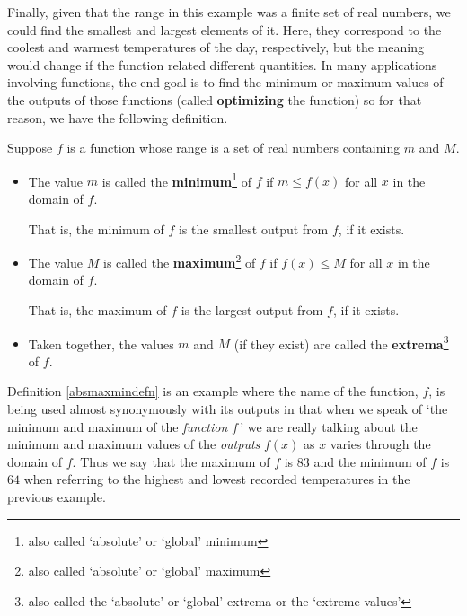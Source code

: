 \medskip

Finally, given that the range in this example was a finite set of real numbers, we could find the smallest and largest elements of it.  Here, they correspond to the coolest and warmest temperatures of the day, respectively, but the meaning would change if the function related different quantities.  In many applications involving functions, the end goal is to find the minimum or maximum values of the outputs of those functions (called \textbf{optimizing} the function) so for that reason, we have the following definition.  

\medskip

\colorbox{ResultColor}{\bbm

\begin{defn}

\label{absmaxmindefn}

Suppose $f$ is a function whose range is a set of real numbers containing $m$ and $M$.

\begin{itemize}

\item  The value $m$ is called the \textbf{minimum}\footnote{also called `absolute' or `global' minimum} of $f$ if $m \leq f(x)$ for all $x$ in the domain of $f$. 

That is, the minimum of $f$ is the smallest output from $f$, if it exists.

\item  The value $M$ is called the \textbf{maximum}\footnote{also called `absolute' or `global' maximum}  of $f$ if $f(x) \leq M$ for all $x$ in the domain of $f$. 

That is, the maximum of $f$ is the largest output from $f$, if it exists.

\item  Taken together, the values $m$ and $M$ (if they exist) are called the \textbf{extrema}\footnote{also called the `absolute' or `global' extrema or the `extreme values'} of $f$.

\end{itemize}

\end{defn}

\ebm}

\medskip

Definition \ref{absmaxmindefn} is an example where the name of the function, $f$, is being used almost synonymously with its outputs in that when we speak of `the minimum and maximum of the \textit{function} $f\,$' we are really talking about the minimum and maximum values of the \textit{outputs} $f(x)$ as $x$ varies through the domain of $f$.  Thus we say that the  maximum of $f$ is $83$ and the  minimum of $f$ is $64$ when referring to the highest and lowest recorded temperatures in the previous example.  

